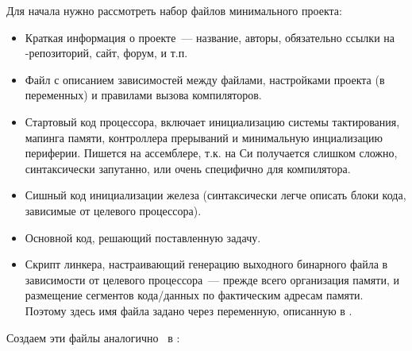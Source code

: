
\label{labhello}

Для начала нужно рассмотреть набор файлов минимального проекта:

\begin{itemize}

\item {}

Краткая информация о проекте\ --- название, авторы, обязательно ссылки на
\git-репозиторий, сайт, форум, и т.п.
 
\item {}

Файл с описанием зависимостей между файлами, настройками проекта (в переменных)
и правилами вызова компиляторов.

\item {}

Стартовый код процессора, включает инициализацию системы тактирования, мапинга
памяти, контроллера прерываний и минимальную инциализацию периферии.
Пишется на ассемблере, т.к. на Си получается слишком сложно, синтаксически
запутанно, или очень специфично для компилятора.

\item {}

Сишный код инициализации железа (синтаксически легче описать блоки кода,
зависимые от целевого процессора).

\item {}

Основной код, решающий поставленную задачу. 

\item {}

Скрипт линкера, настраивающий генерацию выходного бинарного файла в 
зависимости от целевого процессора\ --- прежде всего организация памяти,
и размещение сегментов кода/данных по фактическим адресам памяти.
Поэтому здесь имя файла задано через переменную, описанную в \makefile. 

\end{itemize}

\bigskip Создаем эти файлы аналогично \makefile\ в :

\bigskip{}











